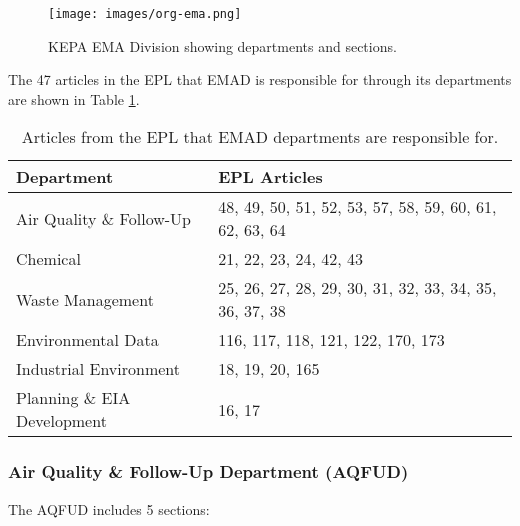 %
\begin{figure}[H]
\centering
\texttt{[image: images/org-ema.png]} 
\caption{KEPA EMA Division showing departments and sections.}
\label{fig:emaorg}
\end{figure}
%

The 47 articles in the EPL that EMAD is responsible for through its departments are shown in Table \ref{tab:emadarts}.

\begin{table}[H]
\centering
\caption{Articles from the EPL that EMAD departments are responsible for.}
\label{tab:emadarts}
\begin{tabular}{@{}ll@{}}
\toprule
\textbf{Department} & \textbf{EPL Articles} \\ \midrule
Air Quality \& Follow-Up & 48, 49, 50, 51, 52, 53, 57, 58, 59, 60, 61, 62, 63, 64 \\
Chemical & 21, 22, 23, 24, 42, 43 \\
Waste Management & 25, 26, 27, 28, 29, 30, 31, 32, 33, 34, 35, 36, 37, 38 \\
Environmental Data & 116, 117, 118, 121, 122, 170, 173 \\
Industrial Environment & 18, 19, 20, 165 \\
Planning \&  EIA Development & 16, 17 \\ \bottomrule
\end{tabular}
\end{table}

\subsubsection{Air Quality \& Follow-Up Department (AQFUD)}
The AQFUD includes 5 sections:

